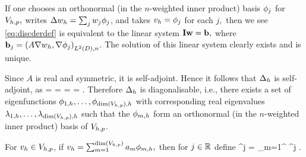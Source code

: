 If one chooses an orthonormal (in the $n$-weighted inner product) basis  $\phi_{j}$ for $V_{h,p},$ writes $\Delta w_{h} = \sum_j w_{j} \phi_{j}$, and takes $v_{h} = \phi_{j}$ for each $j,$ then we see \cref{eq:discderdef} is equivalent to the linear system $\mathbf{I} \mathbf{w} = \mathbf{b},$ where $\bb_{j} = \IPLtDn{A \grad \wh}{\grad \phij}.$ The solution of this linear system clearly exists and is unique.
\epf


Since $A$ is real and symmetric, it is self-adjoint. Hence it follows that $\Delta_{h}$ is self-adjoint, as
\beqs
\IPLtDn{\Deltah \wh}{\vh} =  =  = \overline{\IPLtDn{\Deltah \vh}{\wh}} = \IPLtDn{\wh}{\Deltah \vh}.
\eeqs
Therefore $\Delta_{h}$ is diagonalisable, i.e., there exists a set of eigenfunctions $\phioh,\ldots,\phidimVhph$  with corresponding real eigenvalues $\lambdaoh, \ldots, \lambdadimVhph$ such that the $\phi_{m,h}$ form an orthonormal (in the $n$-weighted inner product) basis of $V_{h,p}$.

For $v_{h} \in V_{h,p}$, if $\vh = \sum_{m=1}^{\dimVhp} \am \phimh,$ then for $j \in \mathbb R$ define
\beqs
\Deltah^j \vh = \sum_{m=1}^{\dimVhp} \lambdamh^j \am \phimh.
\eeqs


